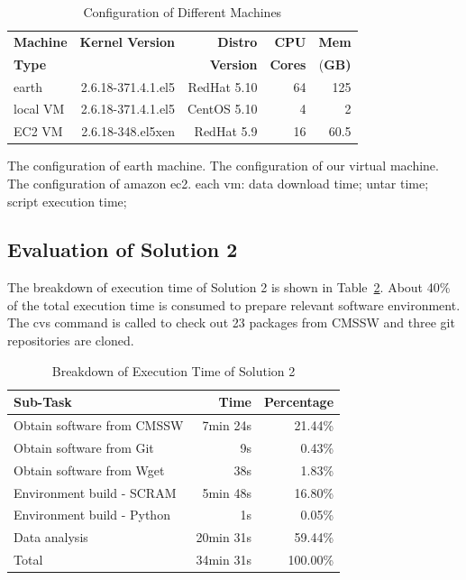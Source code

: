\documentclass{acm_proc_article-sp}
\begin{document}
\begin{table}
    \centering
    \begin{tabular}{|l|r|r|r|r|}
    \hline
    \bf Machine & \bf Kernel Version & \bf Distro & \bf CPU & \bf Mem\\ 
    \bf Type &  & \bf Version & \bf Cores & (\bf GB)\\ \hline
    earth  & 2.6.18-371.4.1.el5 & RedHat 5.10 & 64 & 125 \\ \hline 
    local VM& 2.6.18-371.4.1.el5 & CentOS 5.10 & 4 & 2 \\ \hline
    EC2 VM& 2.6.18-348.el5xen & RedHat 5.9 & 16 & 60.5 \\ \hline
    \end{tabular}
    \caption{Configuration of Different Machines}
    \label{table:config-vm}
\end{table}



The configuration of earth machine. The configuration of our virtual machine. The configuration of amazon ec2.
each vm: data download time; untar time; script execution time;

\subsection{Evaluation of Solution 2}
The breakdown of execution time of Solution 2 is shown in Table~\ref{table:time-2nd}. About 40\%  of the total execution time is consumed to prepare relevant software environment. The cvs command is called to check out 23 packages from CMSSW and three git repositories are cloned.

\begin{table}
    \centering
    \begin{tabular}{|l|r|r|}
    \hline
    \bf Sub-Task & \bf Time & \bf Percentage \\ \hline
    Obtain software from CMSSW & 7min 24s & 21.44\% \\ \hline
    Obtain software from Git & 9s & 0.43\% \\ \hline
    Obtain software from Wget & 38s & 1.83\% \\ \hline
    Environment build - SCRAM & 5min 48s & 16.80\% \\ \hline
    Environment build - Python & 1s & 0.05\% \\ \hline
    Data analysis & 20min 31s & 59.44\% \\ \hline
    Total & 34min 31s & 100.00\% \\ \hline
    \end{tabular}
    \caption{Breakdown of Execution Time of Solution 2}
    \label{table:time-2nd}
\end{table}
\end{document}
